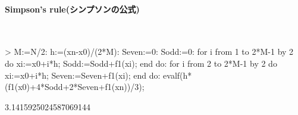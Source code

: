 \paragraph{Simpson's rule(シンプソンの公式)}　
\begin{MapleInput}
> M:=N/2: h:=(xn-x0)/(2*M): Seven:=0: Sodd:=0: 
  for i from 1 to 2*M-1 by 2 do
    xi:=x0+i*h; 
    Sodd:=Sodd+f1(xi); 
  end do: 
  for i from 2 to 2*M-1 by 2 do
    xi:=x0+i*h; 
    Seven:=Seven+f1(xi); 
  end do:
  evalf(h*(f1(x0)+4*Sodd+2*Seven+f1(xn))/3);
\end{MapleInput}
\begin{MapleOutput}
3.1415925024587069144
\end{MapleOutput}

